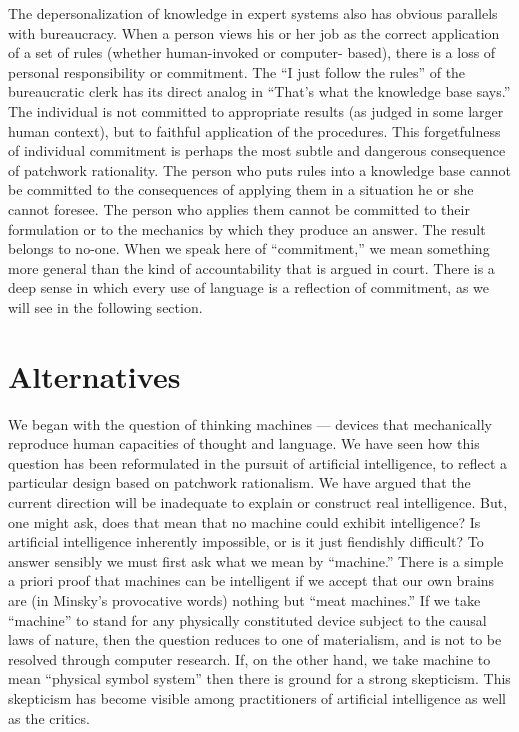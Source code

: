 \documentclass[12pt]{article}
\begin{document}
The depersonalization of knowledge in expert systems also has obvious parallels with bureaucracy. When a person views his or her job as the correct application of a set of rules (whether human-invoked or computer- based), there is a loss of personal responsibility or commitment. The ``I just follow the rules'' of the bureaucratic clerk has its direct analog in ``That's what the knowledge base says.'' The individual is not committed to appropriate results (as judged in some larger human context), but to faithful application of the procedures. This forgetfulness of individual commitment is perhaps the most subtle and dangerous consequence of patchwork rationality. The person who puts rules into a knowledge base cannot be committed to the consequences of applying them in a situation he or she cannot foresee. The person who applies them cannot be committed to their formulation or to the mechanics by which they produce an answer. The result belongs to no-one. When we speak here of ``commitment,'' we mean something more general than the kind of accountability that is argued in court. There is a deep sense in which every use of language is a reflection of commitment, as we will see in the following section.

\section{Alternatives}

We began with the question of thinking machines --- devices that mechanically reproduce human capacities of thought and language. We have seen how this question has been reformulated in the pursuit of artificial intelligence, to reflect a particular design based on patchwork rationalism. We have argued that the current direction will be inadequate to explain or construct real intelligence.
But, one might ask, does that mean that no machine could exhibit intelligence? Is artificial intelligence inherently impossible, or is it just fiendishly difficult? To answer sensibly we must first ask what we mean by ``machine.'' There is a simple a priori proof that machines can be intelligent if we accept that our own brains are (in Minsky's provocative words) nothing but ``meat machines.'' If we take ``machine'' to stand for any physically constituted device subject to the causal laws of nature, then the question reduces to one of materialism, and is not to be resolved through computer research. If, on the other hand, we take machine to mean ``physical symbol system'' then there is ground for a strong skepticism. This skepticism has become visible among practitioners of artificial intelligence as well as the critics.
\end{document}
